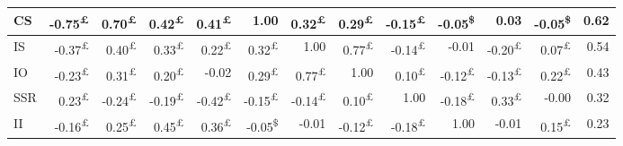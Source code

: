 \documentclass{singlecol-new}
\theoremstyle{TH}{
\newtheorem{lemma}{Lemma}
\newtheorem{theorem}[lemma]{Theorem}
\newtheorem{corrolary}[lemma]{Corrolary}
\newtheorem{conjecture}[lemma]{Conjecture}
\newtheorem{proposition}[lemma]{Proposition}
\newtheorem{claim}[lemma]{Claim}
\newtheorem{stheorem}[lemma]{Wrong Theorem}
\newtheorem{algorithm}{Algorithm}
}
\theoremstyle{THrm}{
\newtheorem{definition}{Definition}[section]
\newtheorem{question}{Question}[section]
\newtheorem{remark}{Remark}
\newtheorem{scheme}{Scheme}
}
\theoremstyle{THhit}{
\newtheorem{case}{Case}[section]
}
\begin{document}
\begin{table*}[h!]
\begin{tabular}{|l|r|r|r|r|r|r|r|r|r|r|r|r|}
		CS & \cellcolor{gray!37}-0.75\textsuperscript{£} & \cellcolor{gray!35}0.70\textsuperscript{£} & \cellcolor{gray!21}0.42\textsuperscript{£} & \cellcolor{gray!20}0.41\textsuperscript{£} & \cellcolor{gray!50}1.00 & \cellcolor{gray!16}0.32\textsuperscript{£} & \cellcolor{gray!14}0.29\textsuperscript{£} & \cellcolor{gray!7}-0.15\textsuperscript{£} & \cellcolor{gray!2}-0.05\textsuperscript{\$} & \cellcolor{gray!1}0.03 & \cellcolor{gray!2}-0.05\textsuperscript{\$} & 0.62 \\ \hline
		
		IS & \cellcolor{gray!18}-0.37\textsuperscript{£} & \cellcolor{gray!20}0.40\textsuperscript{£} & \cellcolor{gray!16}0.33\textsuperscript{£} & \cellcolor{gray!11}0.22\textsuperscript{£} & \cellcolor{gray!16}0.32\textsuperscript{£} & \cellcolor{gray!50}1.00 & \cellcolor{gray!38}0.77\textsuperscript{£} & \cellcolor{gray!7}-0.14\textsuperscript{£} & \cellcolor{gray!0}-0.01 & \cellcolor{gray!10}-0.20\textsuperscript{£} & \cellcolor{gray!3}0.07\textsuperscript{£} & 0.54 \\ \hline
		
		IO & \cellcolor{gray!11}-0.23\textsuperscript{£} & \cellcolor{gray!15}0.31\textsuperscript{£} & \cellcolor{gray!10}0.20\textsuperscript{£} & \cellcolor{gray!1}-0.02 & \cellcolor{gray!14}0.29\textsuperscript{£} & \cellcolor{gray!38}0.77\textsuperscript{£} & \cellcolor{gray!50}1.00 & \cellcolor{gray!5}0.10\textsuperscript{£} & \cellcolor{gray!6}-0.12\textsuperscript{£} & \cellcolor{gray!6}-0.13\textsuperscript{£} & \cellcolor{gray!11}0.22\textsuperscript{£} & 0.43 \\ \hline
		
		SSR & \cellcolor{gray!11}0.23\textsuperscript{£} & \cellcolor{gray!12}-0.24\textsuperscript{£} & \cellcolor{gray!9}-0.19\textsuperscript{£} & \cellcolor{gray!21}-0.42\textsuperscript{£} & \cellcolor{gray!7}-0.15\textsuperscript{£} & \cellcolor{gray!7}-0.14\textsuperscript{£} & \cellcolor{gray!5}0.10\textsuperscript{£} & \cellcolor{gray!50}1.00 & \cellcolor{gray!9}-0.18\textsuperscript{£} & \cellcolor{gray!16}0.33\textsuperscript{£} & \cellcolor{gray!0}-0.00 & 0.32 \\ \hline
		
		II & \cellcolor{gray!8}-0.16\textsuperscript{£} & \cellcolor{gray!12}0.25\textsuperscript{£} & \cellcolor{gray!22}0.45\textsuperscript{£} & \cellcolor{gray!18}0.36\textsuperscript{£} & \cellcolor{gray!2}-0.05\textsuperscript{\$} & \cellcolor{gray!0}-0.01 & \cellcolor{gray!6}-0.12\textsuperscript{£} & \cellcolor{gray!9}-0.18\textsuperscript{£} & \cellcolor{gray!50}1.00 & \cellcolor{gray!0}-0.01 & \cellcolor{gray!7}0.15\textsuperscript{£} & 0.23 \\ \hline
		

\end{tabular}
\end{table*}
\end{document}
